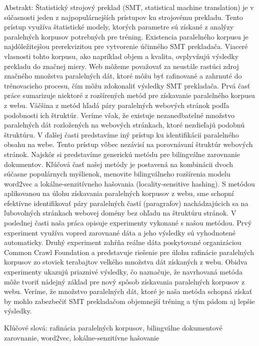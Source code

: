 Abstrakt: Štatistický strojový preklad (SMT, statistical machine translation) je v súčasnosti jeden z najpopulárnejších prístupov ku strojovému prekladu. Tento prístup využíva štatistické modely, ktorých parametre sú získané z analýzy paralelných korpusov potrebných pre tréning. Existencia paralelného korpusu je najdôležitejšou prerekvizitou pre vytvorenie účinného SMT prekladača. Viaceré vlasnosti tohto korpusu, ako napríklad objem a kvalita, ovplyvňujú výsledky prekladu do značnej miery. Web môžeme považovať za neustále rastúci zdroj značného množstva paralelných dát, ktoré môžu byť rafinované a zahrnuté do trénovacieho procesu, čím môžu zdokonaliť výsledky SMT prekladača. Prvá časť práce sumarizuje niektoré z rozšírených metód pre získavanie paralelného korpusu z webu. Väčšina z metód hľadá páry paralelných webových stránok podľa podobnosti ich štruktúr. Veríme však, že existuje nezanedbatelné množstvo paralelných dát rozložených na webových stránkach, ktoré nezdieľajú podobnú štruktúru. V ďalšej časti predstavíme iný prístup ku identifikácii paralelného obsahu na webe. Tento prístup vôbec nezávisí na porovnávaní štruktúr webových stránok. Najskôr si predstavíme generickú metódu pre bilingválne zarovnanie dokumentov. Kľúčová časť našej metódy je postavená na kombinácii dvoch súčasne populárnych myšlienok, menovite bilingválneho rozšírenia modelu word2vec a lokálne-senzitívneho hašovania (locality-sensitive hashing). S metódou aplikovanou na úlohu získavania paralelných korpusov z webu, sme schopní efektívne identifikovať páry paralelných častí (paragrafov) nachádzajúcich sa na ľubovolných stránkach webovej domény bez ohľadu na štruktúru stránok. V poslednej časti naša práca opisuje experimenty vykonané s našou metódou. Prvý experiment využíva vopred zarovnané dáta a jeho výsledky sú vyhodnotené automaticky. Druhý experiment zahŕňa reálne dáta poskytované organizáciou Common Crawl Foundation a predstavuje riešenie pre úlohu rafinácie paralelných korpusov zo stoviek terabajtov velkého množstva dát získaných z webu. Obidva experimenty ukazujú priaznivé výsledky, čo naznačuje, že navrhovaná metóda môže tvoriť nádejný základ pre nový spôsob získavania paralelných korpusov z webu. Veríme, že množstvo paralelných dát, ktoré je naša metóda schopná získať by mohlo zabezbečiť SMT prekladačom objemnejší tréning a tým pádom aj lepšie výsledky.

Kľúčové slová: rafinácia paralelných korpusov, bilingválne dokumentové zarovnanie, word2vec, lokálne-senzitívne hašovanie

\nonfrenchspacing
